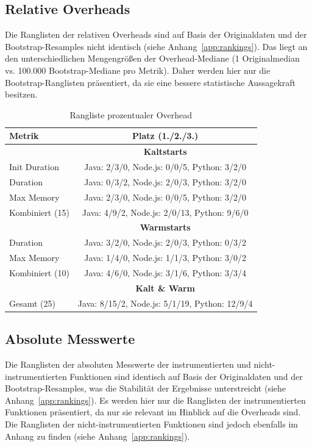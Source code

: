 \subsection{Relative Overheads}
Die Ranglisten der relativen Overheads sind auf Basis der Originaldaten und der Bootstrap-Resamples nicht identisch 
(siehe Anhang~\ref{app:rankings}). Das liegt an den unterschiedlichen Mengengrößen der Overhead-Mediane (1 Originalmedian vs. 
100.000 Bootstrap-Mediane pro Metrik). Daher werden hier nur die Bootstrap-Ranglisten präsentiert, da sie eine bessere statistische 
Aussagekraft besitzen.
\begin{table}[H]
\centering
\footnotesize
\setlength{\tabcolsep}{8pt}
\caption{Rangliste prozentualer Overhead}
\label{res:ranking-overhead-cold-bootstrap}
\begin{tabular}{|l|c|}
\hline
\textbf{Metrik} & \textbf{Platz (1./2./3.)} \\
\hline
& \textbf{Kaltstarts} \\
\hline
Init Duration & Java: 2/3/0, Node.js: 0/0/5, Python: 3/2/0 \\
\hline
Duration      & Java: 0/3/2, Node.js: 2/0/3, Python: 3/2/0 \\
\hline
Max Memory    & Java: 2/3/0, Node.js: 0/0/5, Python: 3/2/0 \\
\hline
Kombiniert (15) & Java: 4/9/2, Node.js: 2/0/13, Python: 9/6/0 \\
\hline
& \textbf{Warmstarts} \\
\hline
Duration      & Java: 3/2/0, Node.js: 2/0/3, Python: 0/3/2 \\
\hline
Max Memory    & Java: 1/4/0, Node.js: 1/1/3, Python: 3/0/2 \\
\hline
Kombiniert (10) & Java: 4/6/0, Node.js: 3/1/6, Python: 3/3/4 \\
\hline
& \textbf{Kalt \& Warm} \\
\hline
Gesamt (25)   & Java: 8/15/2, Node.js: 5/1/19, Python: 12/9/4 \\
\hline
\end{tabular}
\end{table}

\subsection{Absolute Messwerte} 
Die Ranglisten der absoluten Messwerte der instrumentierten und nicht-instrumentierten 
Funktionen sind identisch auf Basis der Originaldaten und der Bootstrap-Resamples, was die Stabilität der Ergebnisse unterstreicht 
(siehe Anhang~\ref{app:rankings}).
Es werden hier nur die Ranglisten der instrumentierten Funktionen präsentiert, da nur sie relevant im Hinblick auf die Overheads sind. 
Die Ranglisten der nicht-instrumentierten Funktionen sind jedoch ebenfalls im Anhang zu finden (siehe Anhang~\ref{app:rankings}).

